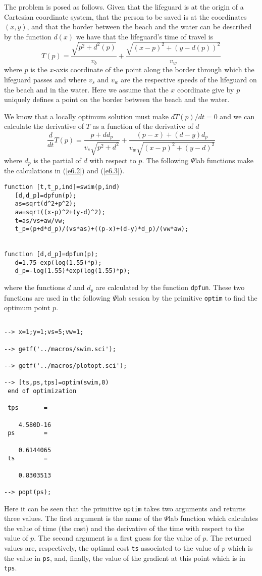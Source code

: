 	The problem is posed as follows.  Given that the lifeguard 
is at the origin of a Cartesian coordinate system, that the person
to be saved is at the coordinates $(x,y)$, and that the border
between the beach and the water can be described by the function
$d(x)$ we have that the lifeguard's time of travel is
\begin{equation}
T(p)=\frac{\sqrt{p^2+d^2(p)}}{v_b}+\frac{\sqrt{(x-p)^2+(y-d(p))^2}}{v_w}
\label{e6.2}
\end{equation}
where $p$ is the $x$-axis coordinate of the point along the border through
which the lifeguard passes and
where $v_s$ and $v_w$ are the respective 
speeds of the lifeguard on the beach and in the water.
Here we assume that the $x$ coordinate give by $p$ uniquely defines
a point on the border between the beach and the water.

	We know that a locally optimum solution must make 
$dT(p)/dt=0$ and we can calculate the derivative of $T$ as
a function of the derivative of $d$
\begin{equation}
\frac{d}{dt}T(p)=\frac{p+dd_p}{v_s\sqrt{p^2+d^2}}
                 +\frac{(p-x)+(d-y)d_p}{v_w\sqrt{(x-p)^2+(y-d)^2}}
\label{e6.3}
\end{equation}
where $d_p$ is the partial of $d$ with respect to $p$.  The following
$\Psi$lab functions make the calculations in (\ref{e6.2}) and (\ref{e6.3}).
\begin{verbatim}
function [t,t_p,ind]=swim(p,ind)
   [d,d_p]=dpfun(p);
   as=sqrt(d^2+p^2);
   aw=sqrt((x-p)^2+(y-d)^2);
   t=as/vs+aw/vw;
   t_p=(p+d*d_p)/(vs*as)+((p-x)+(d-y)*d_p)/(vw*aw);


function [d,d_p]=dpfun(p);
   d=1.75-exp(log(1.55)*p);
   d_p=-log(1.55)*exp(log(1.55)*p);
\end{verbatim}
where the functions $d$ and $d_p$ are calculated by the function {\tt dpfun}.
These two functions are used in the following $\Psi$lab session by the
primitive {\tt optim} to find the optimum point $p$.
\begin{verbatim}
 
--> x=1;y=1;vs=5;vw=1;
 
--> getf('../macros/swim.sci');
 
--> getf('../macros/plotopt.sci');
 
--> [ts,ps,tps]=optim(swim,0)
 end of optimization
 
 tps       =
 
    4.580D-16  
 ps        =
 
    0.6144065  
 ts        =
 
    0.8303513  
 
--> popt(ps);
\end{verbatim}
Here it can be seen that the primitive {\tt optim} takes two 
arguments and returns three values.  The first argument is the
name of the $\Psi$lab function which calculates the value of time (the cost)
and the derivative of the time with respect to the value of $p$.
The second argument is a first guess for the value of $p$.
The returned values are, respectively, the optimal cost {\tt ts}
associated to the value of $p$ which is the value in {\tt ps}, and,
finally, the value of the gradient at this point which is in
{\tt tps}.


